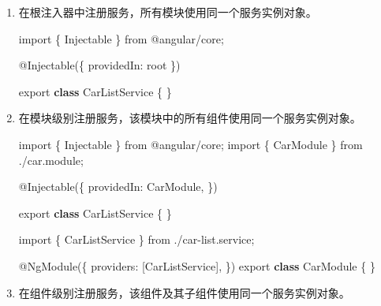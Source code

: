 \documentclass[
]{article}
\newenvironment{Shaded}{}{}
\newcommand{\DataTypeTok}[1]{\textcolor[rgb]{0.56,0.13,0.00}{#1}}
\newcommand{\FunctionTok}[1]{\textcolor[rgb]{0.02,0.16,0.49}{#1}}
\newcommand{\ImportTok}[1]{#1}
\newcommand{\KeywordTok}[1]{\textcolor[rgb]{0.00,0.44,0.13}{\textbf{#1}}}
\newcommand{\NormalTok}[1]{#1}
\newcommand{\OperatorTok}[1]{\textcolor[rgb]{0.40,0.40,0.40}{#1}}
\newcommand{\StringTok}[1]{\textcolor[rgb]{0.25,0.44,0.63}{#1}}
\begin{document}
\begin{enumerate}
\def\labelenumi{\arabic{enumi}.}
\item
  在根注入器中注册服务，所有模块使用同一个服务实例对象。

\begin{Shaded}
\begin{Highlighting}[]
\ImportTok{import}\NormalTok{ \{ Injectable \} }\ImportTok{from} \StringTok{\textquotesingle{}@angular/core\textquotesingle{}}\OperatorTok{;}

\NormalTok{@}\FunctionTok{Injectable}\NormalTok{(\{}
  \DataTypeTok{providedIn}\OperatorTok{:} \StringTok{\textquotesingle{}root\textquotesingle{}}
\NormalTok{\})}

\ImportTok{export} \KeywordTok{class}\NormalTok{ CarListService \{}
\NormalTok{\}}
\end{Highlighting}
\end{Shaded}
\item
  在模块级别注册服务，该模块中的所有组件使用同一个服务实例对象。

\begin{Shaded}
\begin{Highlighting}[]
\ImportTok{import}\NormalTok{ \{ Injectable \} }\ImportTok{from} \StringTok{\textquotesingle{}@angular/core\textquotesingle{}}\OperatorTok{;}
\ImportTok{import}\NormalTok{ \{ CarModule \} }\ImportTok{from} \StringTok{\textquotesingle{}./car.module\textquotesingle{}}\OperatorTok{;}

\NormalTok{@}\FunctionTok{Injectable}\NormalTok{(\{}
  \DataTypeTok{providedIn}\OperatorTok{:}\NormalTok{ CarModule}\OperatorTok{,}
\NormalTok{\})}

\ImportTok{export} \KeywordTok{class}\NormalTok{ CarListService \{}
\NormalTok{\}}
\end{Highlighting}
\end{Shaded}

\begin{Shaded}
\begin{Highlighting}[]
\ImportTok{import}\NormalTok{ \{ CarListService \} }\ImportTok{from} \StringTok{\textquotesingle{}./car{-}list.service\textquotesingle{}}\OperatorTok{;}

\NormalTok{@}\FunctionTok{NgModule}\NormalTok{(\{}
  \DataTypeTok{providers}\OperatorTok{:}\NormalTok{ [CarListService]}\OperatorTok{,}
\NormalTok{\})}
\ImportTok{export} \KeywordTok{class}\NormalTok{ CarModule \{}
\NormalTok{\}}
\end{Highlighting}
\end{Shaded}
\item
  在组件级别注册服务，该组件及其子组件使用同一个服务实例对象。


\end{enumerate}
\end{document}
